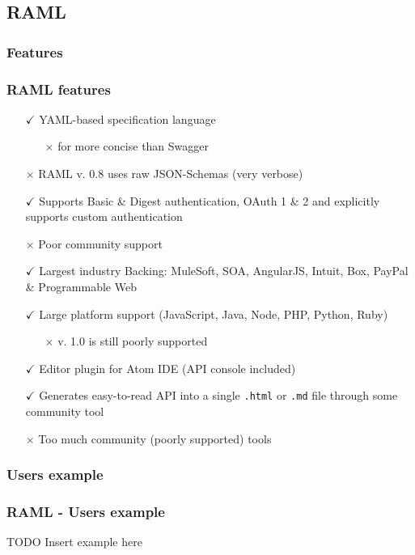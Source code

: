 \subsection{RAML}

\subsubsection{Features}

\begin{frame} %
	\frametitle{RAML features}
	
	\begin{itemize}
			\item[$\checkmark$] YAML-based specification language
			\begin{itemize}
				\item[$\times$] for more concise than Swagger
			\end{itemize} 
			\item[$\times$] RAML v. 0.8 uses raw JSON-Schemas (very verbose)
			\item[$\checkmark$] Supports Basic \& Digest authentication, OAuth 1 \& 2 and explicitly supports custom authentication
			\item[$\times$] Poor community support
			\item[$\checkmark$] Largest industry Backing: MuleSoft, SOA, AngularJS, Intuit, Box, PayPal \& Programmable Web
			\item[$\checkmark$] Large platform support (JavaScript, Java, Node, PHP, Python, Ruby)
			\begin{itemize}
				\item[$\times$] v. 1.0 is still poorly supported
			\end{itemize} 
			\item[$\checkmark$] Editor plugin for Atom IDE (API console included) 
			\item[$\checkmark$] Generates easy-to-read API into a single \texttt{.html} or \texttt{.md} file through some community tool
			\item[$\times$] Too much community (poorly supported) tools
		\end{itemize}
\end{frame}

\subsubsection{Users example}

\begin{frame} %
	\frametitle{RAML - Users example}
	
	\begin{alertblock}{TODO}
		Insert example here
	\end{alertblock}
\end{frame}